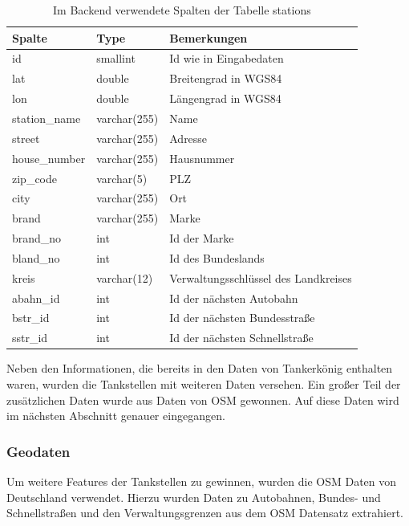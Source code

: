 \documentclass[
ngerman          %
,a4paper          %
,11pt
,pdftex
]{report}
\begin{document}
\begin{table}[h]
	\centering
	\begin{tabular}{l l l}
		\textbf{Spalte} & \textbf{Type} & \textbf{Bemerkungen} \\ 
		\hline \hline
		id & smallint & Id wie in Eingabedaten \\
        lat & double & Breitengrad in WGS84 \\
        lon & double & Längengrad in WGS84 \\
        station\_name & varchar(255) & Name \\
        street & varchar(255) & Adresse \\
        house\_number & varchar(255) & Hausnummer \\
        zip\_code & varchar(5) & PLZ  \\
        city & varchar(255) & Ort \\
        brand & varchar(255) & Marke  \\
        brand\_no & int & Id der Marke \\
        bland\_no & int & Id des Bundeslands \\
        kreis & varchar(12) & Verwaltungsschlüssel des Landkreises \\
        abahn\_id & int & Id der nächsten Autobahn \\
        bstr\_id & int & Id der nächsten Bundesstraße \\
        sstr\_id & int & Id der nächsten Schnellstraße \\
		\hline 
	\end{tabular}
	\caption{Im Backend verwendete Spalten der Tabelle stations}
	\label{tab:stations}	
\end{table} 

Neben den Informationen, die bereits in den Daten von Tankerkönig enthalten waren, wurden die Tankstellen mit weiteren Daten versehen. Ein großer Teil der zusätzlichen Daten wurde aus Daten von \ac{OSM} gewonnen. Auf diese Daten wird im nächsten Abschnitt genauer eingegangen.

\subsubsection{Geodaten}

Um weitere Features der Tankstellen zu gewinnen, wurden die \ac{OSM} Daten von Deutschland verwendet. Hierzu wurden Daten zu Autobahnen, Bundes- und Schnellstraßen und den Verwaltungsgrenzen aus dem \ac{OSM} Datensatz extrahiert.
\end{document}
